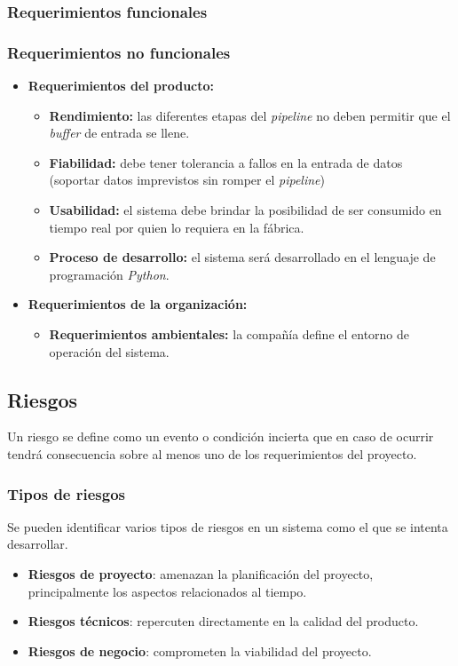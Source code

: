 \documentclass[a4paper,12pt]{article}
\begin{document}
\subsubsection{Requerimientos funcionales}

\subsubsection{Requerimientos no funcionales}
\begin{itemize}
	\item \textbf{Requerimientos del producto:}
	\begin{itemize}
		\item \textbf{Rendimiento:} las diferentes etapas del \textit{pipeline} no deben permitir que el \textit{buffer} de entrada se llene.
		\item \textbf{Fiabilidad:} debe tener tolerancia a fallos en la entrada de datos (soportar datos imprevistos sin romper el \textit{pipeline})
		\item \textbf{Usabilidad:} el sistema debe brindar la posibilidad de ser consumido en tiempo real por quien lo requiera en la fábrica.
		\item \textbf{Proceso de desarrollo:} el sistema será desarrollado en el lenguaje de programación \textit{Python}.
	\end{itemize}
	\item \textbf{Requerimientos de la organización:}
	\begin{itemize}
		\item \textbf{Requerimientos ambientales:} la compañía define el entorno de operación del sistema.
	\end{itemize}
\end{itemize}

\subsection{Riesgos}
Un riesgo se define como un evento o condición incierta que en caso de ocurrir tendrá consecuencia sobre al menos uno de los requerimientos del proyecto.
\subsubsection{Tipos de riesgos}
Se pueden identificar varios tipos de riesgos en un sistema como el que se intenta desarrollar.
\begin{itemize}[noitemsep, topsep=2pt]
	\item \textbf{Riesgos de proyecto}: amenazan la planificación del proyecto, principalmente los aspectos relacionados al tiempo.
	\item \textbf{Riesgos técnicos}: repercuten directamente en la calidad del producto.
	\item \textbf{Riesgos de negocio}: comprometen la viabilidad del proyecto.
\end{itemize}
\end{document}
